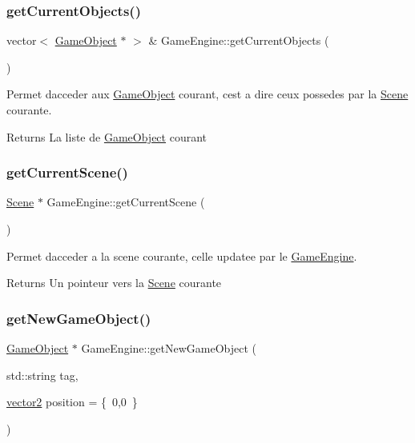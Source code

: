 \subsubsection{\texorpdfstring{get\+Current\+Objects()}{getCurrentObjects()}}
{\footnotesize\ttfamily vector$<$ \hyperlink{class_game_object}{Game\+Object} $\ast$ $>$ \& Game\+Engine\+::get\+Current\+Objects (\begin{DoxyParamCaption}{ }\end{DoxyParamCaption})}



Permet d\textquotesingle{}acceder aux \hyperlink{class_game_object}{Game\+Object} courant, c\textquotesingle{}est a dire ceux possedes par la \hyperlink{class_scene}{Scene} courante. 

\begin{DoxyReturn}{Returns}
La liste de \hyperlink{class_game_object}{Game\+Object} courant 
\end{DoxyReturn}
\hypertarget{class_game_engine_a8116aae790eaf236907d5d75401cd628}{}\label{class_game_engine_a8116aae790eaf236907d5d75401cd628} 
\subsubsection{\texorpdfstring{get\+Current\+Scene()}{getCurrentScene()}}
{\footnotesize\ttfamily \hyperlink{class_scene}{Scene} $\ast$ Game\+Engine\+::get\+Current\+Scene (\begin{DoxyParamCaption}{ }\end{DoxyParamCaption})}



Permet d\textquotesingle{}acceder a la scene courante, celle updatee par le \hyperlink{class_game_engine}{Game\+Engine}. 

\begin{DoxyReturn}{Returns}
Un pointeur vers la \hyperlink{class_scene}{Scene} courante 
\end{DoxyReturn}
\hypertarget{class_game_engine_adaaa9e4c0b2cfd2f248164a16684c700}{}\label{class_game_engine_adaaa9e4c0b2cfd2f248164a16684c700} 
\subsubsection{\texorpdfstring{get\+New\+Game\+Object()}{getNewGameObject()}}
{\footnotesize\ttfamily \hyperlink{class_game_object}{Game\+Object} $\ast$ Game\+Engine\+::get\+New\+Game\+Object (\begin{DoxyParamCaption}\item[{std\+::string}]{tag,  }\item[{\hyperlink{structvector2}{vector2}}]{position = {\ttfamily \{~0,0~\}} }\end{DoxyParamCaption})}



